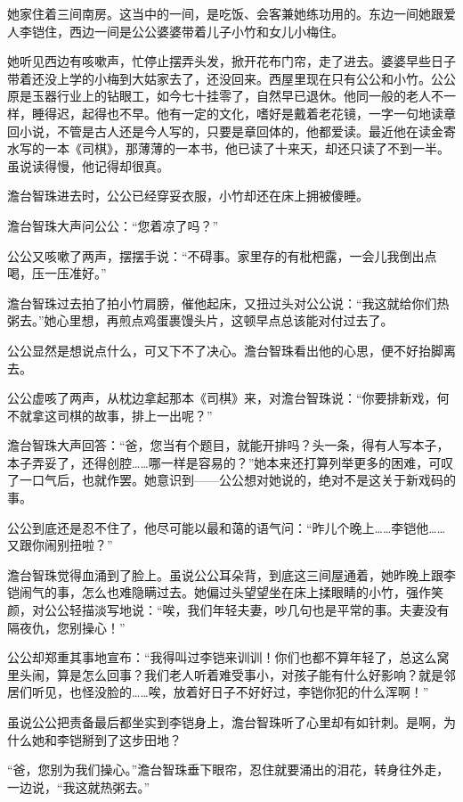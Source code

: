 \par 她家住着三间南房。这当中的一间，是吃饭、会客兼她练功用的。东边一间她跟爱人李铠住，西边一间是公公婆婆带着儿子小竹和女儿小梅住。
\par 她听见西边有咳嗽声，忙停止摆弄头发，掀开花布门帘，走了进去。婆婆早些日子带着还没上学的小梅到大姑家去了，还没回来。西屋里现在只有公公和小竹。公公原是玉器行业上的钻眼工，如今七十挂零了，自然早已退休。他同一般的老人不一样，睡得迟，起得也不早。他有一定的文化，嗜好是戴着老花镜，一字一句地读章回小说，不管是古人还是今人写的，只要是章回体的，他都爱读。最近他在读金寄水写的一本《司棋》，那薄薄的一本书，他已读了十来天，却还只读了不到一半。虽说读得慢，他记得却很真。
\par 澹台智珠进去时，公公已经穿妥衣服，小竹却还在床上拥被傻睡。
\par 澹台智珠大声问公公：“您着凉了吗？”
\par 公公又咳嗽了两声，摆摆手说：“不碍事。家里存的有枇杷露，一会儿我倒出点喝，压一压准好。”
\par 澹台智珠过去拍了拍小竹肩膀，催他起床，又扭过头对公公说：“我这就给你们热粥去。”她心里想，再煎点鸡蛋裹馒头片，这顿早点总该能对付过去了。
\par 公公显然是想说点什么，可又下不了决心。澹台智珠看出他的心思，便不好抬脚离去。
\par 公公虚咳了两声，从枕边拿起那本《司棋》来，对澹台智珠说：“你要排新戏，何不就拿这司棋的故事，排上一出呢？”
\par 澹台智珠大声回答：“爸，您当有个题目，就能开排吗？头一条，得有人写本子，本子弄妥了，还得创腔……哪一样是容易的？”她本来还打算列举更多的困难，可叹了一口气后，也就作罢。她意识到——公公想对她说的，绝对不是这关于新戏码的事。
\par 公公到底还是忍不住了，他尽可能以最和蔼的语气问：“昨儿个晚上……李铠他……又跟你闹别扭啦？”
\par 澹台智珠觉得血涌到了脸上。虽说公公耳朵背，到底这三间屋通着，她昨晚上跟李铠闹气的事，怎么也难隐瞒过去。她偏过头望望坐在床上揉眼睛的小竹，强作笑颜，对公公轻描淡写地说：“唉，我们年轻夫妻，吵几句也是平常的事。夫妻没有隔夜仇，您别操心！”
\par 公公却郑重其事地宣布：“我得叫过李铠来训训！你们也都不算年轻了，总这么窝里头闹，算是怎么回事？我们老人听着难受事小，对孩子能有什么好影响？就是邻居们听见，也怪没脸的……唉，放着好日子不好好过，李铠你犯的什么浑啊！”
\par 虽说公公把责备最后都坐实到李铠身上，澹台智珠听了心里却有如针刺。是啊，为什么她和李铠掰到了这步田地？
\par “爸，您别为我们操心。”澹台智珠垂下眼帘，忍住就要涌出的泪花，转身往外走，一边说，“我这就热粥去。”
